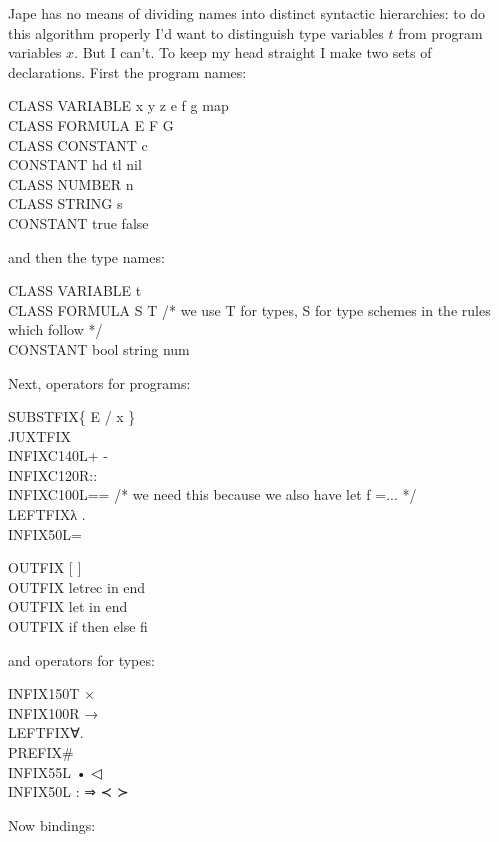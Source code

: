 Jape has no means of dividing names into distinct syntactic hierarchies: to do this algorithm properly I'd want to distinguish type variables $t$ from program variables $x$. But I can't. To keep my head straight I make two sets of declarations. First the program names:
\begin{japeish}
CLASS VARIABLE x y z e f g map\\
CLASS FORMULA E F G\\
CLASS CONSTANT c\\
CONSTANT hd tl nil\\
CLASS NUMBER n\\
CLASS STRING s\\
CONSTANT true false
\end{japeish}
and then the type names:
\begin{japeish}
CLASS VARIABLE t\\
CLASS FORMULA S T /* we use T for types, S for type schemes in the rules which follow */\\
CONSTANT bool string num
\end{japeish}
Next, operators for programs:
\begin{japeish}
SUBSTFIX\tab \{ E / x \}\\
JUXTFIX\\
INFIXC\tab 140L\tab + -\\
INFIXC\tab 120R\tab ::\\
INFIXC\tab 100L\tab == /* we need this because we also have let f =... */\\
LEFTFIX\tab λ .\\
INFIX\tab 50L\tab =
\end{japeish}
\begin{japeish}
OUTFIX [ ]\\
OUTFIX letrec in end\\
OUTFIX let in end\\
OUTFIX if then else fi
\end{japeish}
and operators for types:

\begin{japeish}
INFIX\tab 150T \tab ×\\
INFIX\tab 100R \tab →\\
LEFTFIX\tab ∀.\\
PREFIX\tab \#\\
INFIX\tab 55L \tab • ◁\\
INFIX\tab 50L \tab : ⇒ ≺ ≻
\end{japeish}
Now bindings:

